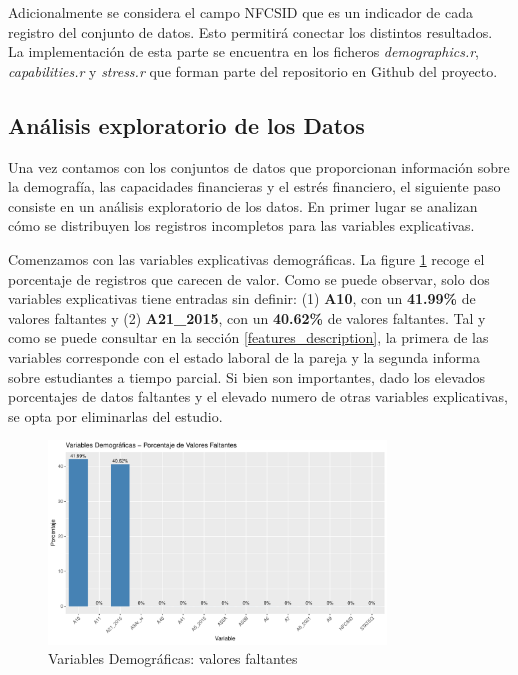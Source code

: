 \documentclass[a4paper, 11pt]{article}
\begin{document}
Adicionalmente se considera el campo NFCSID que es un indicador de cada registro
del conjunto de datos. Esto permitirá conectar los distintos resultados. La 
implementación de esta parte se encuentra en los ficheros \textit{demographics.r}, \textit{capabilities.r} y \textit{stress.r} que forman
parte del repositorio en Github del proyecto\cite{ALMO25}.

\subsection{Análisis exploratorio de los Datos}
Una vez contamos con los conjuntos de datos que proporcionan información sobre
la demografía, las capacidades financieras y el estrés financiero, el siguiente
paso consiste en un análisis exploratorio de los datos. En primer lugar se
analizan cómo se distribuyen los registros incompletos para las variables explicativas.

Comenzamos con las variables explicativas demográficas. La figure \ref{fig:demographic_features_missing_values}
recoge el porcentaje de registros que carecen de valor. Como se puede observar, solo dos 
variables explicativas tiene entradas sin definir: (1) \textbf{A10}, con un
\textbf{41.99\%} de valores faltantes y (2) \textbf{A21\_2015}, con un \textbf{40.62\%} de 
valores faltantes. Tal y como se puede consultar en la sección \ref{features_description}, la 
primera de las variables corresponde con el estado laboral de la pareja y la segunda informa 
sobre estudiantes a tiempo parcial. Si bien son importantes, dado los elevados porcentajes de
datos faltantes y el elevado numero de otras variables explicativas, se opta por eliminarlas
del estudio.

\begin{figure}[ht]
    \centering
    \includegraphics[width=0.8\textwidth]{images/Demographic_Features__Missing_Values.pdf} 
    \caption{Variables Demográficas: valores faltantes}
    \label{fig:demographic_features_missing_values}
\end{figure}
\end{document}
